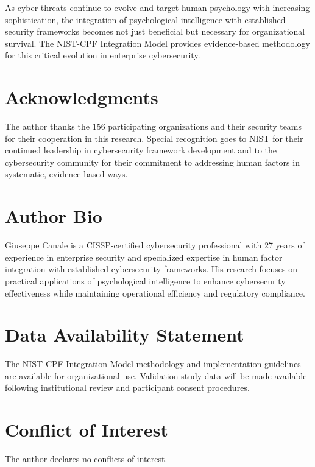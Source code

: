 \documentclass[10pt, twocolumn]{article}
\begin{document}
As cyber threats continue to evolve and target human psychology with increasing sophistication, the integration of psychological intelligence with established security frameworks becomes not just beneficial but necessary for organizational survival. The NIST-CPF Integration Model provides evidence-based methodology for this critical evolution in enterprise cybersecurity.

\section*{Acknowledgments}

The author thanks the 156 participating organizations and their security teams for their cooperation in this research. Special recognition goes to NIST for their continued leadership in cybersecurity framework development and to the cybersecurity community for their commitment to addressing human factors in systematic, evidence-based ways.

\section*{Author Bio}

Giuseppe Canale is a CISSP-certified cybersecurity professional with 27 years of experience in enterprise security and specialized expertise in human factor integration with established cybersecurity frameworks. His research focuses on practical applications of psychological intelligence to enhance cybersecurity effectiveness while maintaining operational efficiency and regulatory compliance.

\section*{Data Availability Statement}

The NIST-CPF Integration Model methodology and implementation guidelines are available for organizational use. Validation study data will be made available following institutional review and participant consent procedures.

\section*{Conflict of Interest}

The author declares no conflicts of interest.
\end{document}
